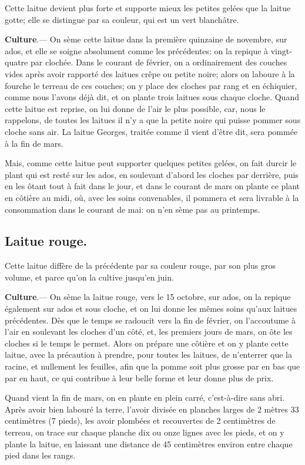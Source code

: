 \documentclass[10pt,a4paper]{book}
\begin{document}
Cette laitue devient plus forte et supporte mieux les petites gelées que la laitue gotte; elle se distingue par sa couleur, qui est un vert blanchâtre.

\textbf{Culture}.--- On sème cette laitue dans la première quinzaine de novembre, sur ados, et elle se soigne absolument comme les précédentes: on la repique à vingt-quatre par clochée. Dans le courant de février, on a ordinairement des couches vides après avoir rapporté des laitues crêpe ou petite noire; alors on laboure à la fourche le terreau de ces couches; on y place des cloches par rang et en échiquier, comme nous l'avons déjà dit, et on plante trois laitues sous chaque cloche. Quand cette laitue est reprise, on lui donne de l'air le plus possible, car, nous le rappelons, de toutes les laitues il n'y a que la petite noire qui puisse pommer sous cloche sans air. La laitue Georges, traitée comme il vient d'être dit, sera pommée à la fin de mars.

Mais, comme cette laitue peut supporter quelques petites gelées, on fait durcir le plant qui est resté sur les ados, en soulevant d'abord les cloches par derrière, puis en les ôtant tout à fait dans le jour, et dans le courant de mars on plante ce plant en côtière au midi, où, avec les soins convenables, il pommera et sera livrable à la consommation dans le courant de mai: on n'en sème pas au printemps.

\subsection{Laitue rouge.}

Cette laitue diffère de la précédente par sa couleur rouge, par son plus gros volume, et parce qu'on la cultive jusqu'en juin.

\textbf{Culture}.--- On sème la laitue rouge, vers le 15 octobre, sur ados, on la repique également sur ados et sous cloche, et on lui donne les mêmes soins qu'aux laitues précédentes. Dès que le temps se radoucit vers la fin de février, on l'accoutume à l'air en soulevant les cloches d'un côté, et, les premiers jours de mars, on ôte les cloches si le temps le permet. Alors on prépare une côtière et on y plante cette laitue, avec la précaution à prendre, pour toutes les laitues, de n'enterrer que la racine, et nullement les feuilles, afin que la pomme soit plus grosse par en bas que par en haut, ce qui contribue à leur belle forme et leur donne plus de prix.

Quand vient la fin de mars, on en plante en plein carré, c'est-à-dire sans abri. Après avoir bien labouré la terre, l'avoir divisée en planches larges de 2 mètres 33 centimètres (7 pieds), les avoir plombées et recouvertes de 2 centimètres de terreau, on trace sur chaque planche dix ou onze lignes avec les pieds, et on y plante la laitue, en laissant une distance de 45 centimètres environ entre chaque pied dans les rangs.
\end{document}
